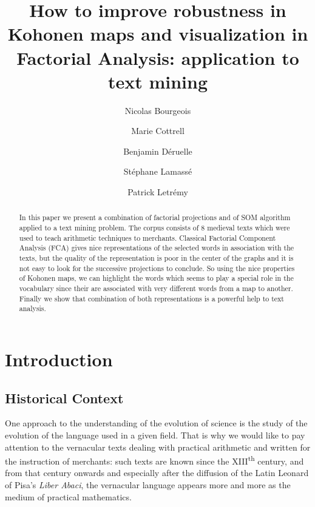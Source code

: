 \documentclass[preprint]{elsarticle}
\begin{document}
\begin{frontmatter}

\title{How to improve robustness in Kohonen maps and visualization in Factorial Analysis:  application to text mining}

\author[samm]{Nicolas Bourgeois}
\author[samm]{Marie Cottrell}
\author[lamop]{Benjamin D\'eruelle}
\author[lamop]{St\'ephane Lamass\'e}
\author[lamop]{Patrick Letr\'emy}

\address[samm]{SAMM - Universit\'e Paris 1 Panth\'eon-Sorbonne 90, rue de Tolbiac, 75013 Paris, France \mailENS,\mailSAMM}
\address[lamop]{PIREH-LAMOP - Universit\'e Paris 1 Panth\'eon-Sorbonne 1, rue Victor Cousin, Paris, France \mailLAMOP}



\begin{abstract}
In this paper we present a combination of factorial projections and of SOM algorithm applied to a text mining problem. The corpus consists of 8 medieval texts which were used to teach arithmetic techniques to merchants. Classical Factorial Component Analysis (FCA) gives nice representations of the selected words in association with the texts, but the quality of the representation is poor in the center of the graphs and it is not easy to look for the successive projections to conclude. So using the nice properties of Kohonen maps, we can highlight the words which seems to play a special role in the vocabulary since their are associated with very different words from a map to another. Finally we show that combination of both representations is a powerful help to text analysis.
\end{abstract}

\end{frontmatter}

\section*{Introduction}
\setcounter{footnote}{0}

\subsection*{Historical Context}

One approach to the understanding of the evolution of science is the study of the evolution of the language used in a given field. That is why we would like to pay attention to the vernacular texts dealing with practical arithmetic and written for the instruction of merchants: such texts are known since the XIII\textsuperscript{th} century, and from that century onwards and especially after the diffusion of the Latin Leonard of Pisa's \textit{Liber Abaci}, the vernacular language appears more and more as the medium of practical mathematics.\\
\end{document}
